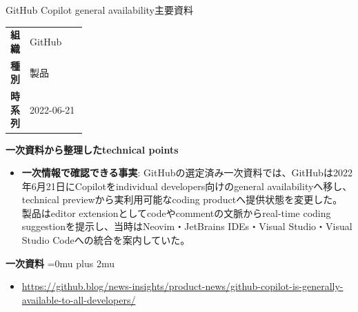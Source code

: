 \begin{technicalnote}{GitHub Copilot general availability}{主要資料}
\begingroup
\begin{tabularx}{\linewidth}{@{}>{\bfseries}p{0.22\linewidth}X@{}}
組織 & GitHub \\
種別 & 製品 \\
時系列 & 2022-06-21 \\
\end{tabularx}
\smallskip
{\bfseries 一次資料から整理したtechnical points}
\begin{itemize}[leftmargin=1.5em,itemsep=0.35em]
\item \textbf{一次情報で確認できる事実}: GitHubの選定済み一次資料では、GitHubは2022年6月21日にCopilotをindividual developers向けのgeneral availabilityへ移し、technical previewから実利用可能なcoding productへ提供状態を変更した。 製品はeditor extensionとしてcodeやcommentの文脈からreal-time coding suggestionを提示し、当時はNeovim・JetBrains IDEs・Visual Studio・Visual Studio Codeへの統合を案内していた。
\end{itemize}
\begin{minipage}{\linewidth}
\begin{samepage}
{\bfseries 一次資料}
\begingroup\sloppy
\Urlmuskip=0mu plus 2mu\relax
\begin{itemize}[leftmargin=1.5em,itemsep=0.25em]
\item {\scriptsize\url{https://github.blog/news-insights/product-news/github-copilot-is-generally-available-to-all-developers/}}
\end{itemize}
\endgroup
\end{samepage}
\end{minipage}
\endgroup
\end{technicalnote}
\medskip

